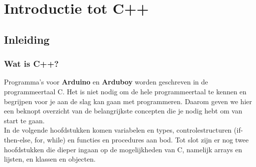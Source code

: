 \documentclass[11pt,fleqn]{book} %
\def\Cpp{{C\nolinebreak[4]\hspace{-.05em}\raisebox{.4ex}{\tiny\bf ++}}}
\begin{document}



\pagestyle{empty} %

\tableofcontents %

\cleardoublepage %

\pagestyle{fancy} %


\part{Introductie tot C++}
\chapter{Inleiding}
\section{Wat is C++?}
Programma's voor \textbf{Arduino} en \textbf{Arduboy} worden geschreven in de programmeertaal \Cpp\index{C++@\Cpp}. Het is niet nodig om de hele programmeertaal te kennen en begrijpen voor je aan de slag kan gaan met programmeren. Daarom geven we hier een beknopt overzicht van de belangrijkste concepten die je nodig hebt om van start te gaan.\\

\noindent In de volgende hoofdstukken komen variabelen en types, controlestructuren (if-then-else, for, while) en functies en procedures aan bod. Tot slot zijn er nog twee hoofdstukken die dieper ingaan op de mogelijkheden van \Cpp, namelijk arrays en lijsten, en klassen en objecten.\\
\end{document}
